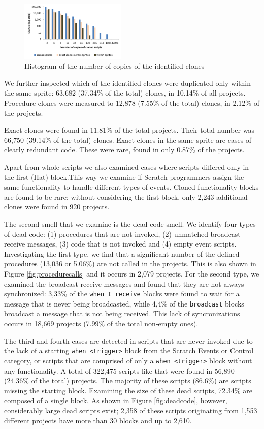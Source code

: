 \documentclass{sig-alternate}
\begin{document}
\begin{figure}
	\centering
	\includegraphics[width=0.45\textwidth]{fig/charts/11clonescopies}
	\caption{Histogram of the number of copies of the identified clones}
	\label{fig:clonescopies}
\end{figure}

We further inspected which of the identified clones were duplicated only within the same sprite: 63,682 (37.34\% of the total) clones, in 10.14\% of all projects. Procedure clones were measured to 12,878 (7.55\% of the total) clones, in 2.12\% of the projects.

Exact clones were found in 11.81\% of the total projects. Their total number was 66,750 (39.14\% of the total) clones. Exact clones in the same sprite are cases of clearly redundant code. These were rare, found in only 0.87\% of the projects.

Apart from whole scripts we also examined cases where scripts differed only in the first (Hat) block.This way we examine if Scratch programmers assign the same functionality to handle different types of events. Cloned functionality blocks are found to be rare: without considering the first block, only 2,243 additional clones were found in 920 projects.

The second smell that we examine is the dead code smell. We identify four types of dead code: (1) procedures that are not invoked, (2) unmatched broadcast-receive messages, (3) code that is not invoked and (4) empty event scripts. Investigating the first type, we find that a significant number of the defined procedures (13,036 or 5.06\%) are not called in the projects. This is also shown in Figure \ref{fig:procedurecalls} and it occurs in 2,079 projects. For the second type, we examined the broadcast-receive messages and found that they are not always synchronized: 3,33\% of the \texttt{when I receive} blocks were found to wait for a message that is never being broadcasted, while 4,4\% of the \texttt{broadcast} blocks broadcast a message that is not being received. This lack of syncronizations occurs in 18,669 projects (7.99\% of the total non-empty ones).

The third and fourth cases are detected in scripts that are never invoked due to the lack of a starting \texttt{when <trigger>} block from the Scratch Events or Control category, or scripts that are comprised of only a \texttt{when <trigger>} block without any functionality. A total of 322,475 scripts like that were found in 56,890 (24.36\% of the total) projects. The majority of these scripts (86.6\%) are scripts missing the starting block. Examining the size of these dead scripts, 72.34\% are composed of a single block. As shown in Figure \ref{fig:deadcode}, however, considerably large dead scripts exist; 2,358 of these scripts originating from 1,553 different projects have more than 30 blocks and up to 2,610.\footnotemark[\ref{repo}]
\end{document}
